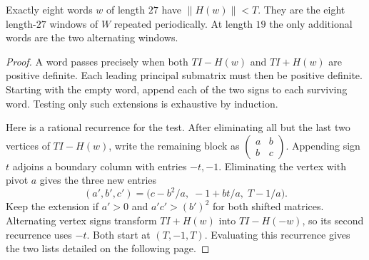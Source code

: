 \documentclass[11pt,letterpaper]{article}
\begin{document}
\begin{lemma}\label{lem:windows}
Exactly eight words $w$ of length $27$ have $\|H(w)\|<T$. They are the eight length-$27$ windows of $W$ repeated periodically. At length $19$ the only additional words are the two alternating windows.
\end{lemma}
\begin{proof}
A word passes precisely when both $TI-H(w)$ and $TI+H(w)$ are positive definite. Each leading principal submatrix must then be positive definite. Starting with the empty word, append each of the two signs to each surviving word. Testing only such extensions is exhaustive by induction.

Here is a rational recurrence for the test. After eliminating all but the last two vertices of $TI-H(w)$, write the remaining block as
$\left(\begin{smallmatrix}a&b\\b&c\end{smallmatrix}\right)$.
Appending sign $t$ adjoins a boundary column with entries $-t,-1$. Eliminating the vertex with pivot $a$ gives the three new entries
\[
     (a',b',c')=\bigl(c-b^2/a,\; -1+bt/a,\; T-1/a\bigr).
\]
Keep the extension if $a'>0$ and $a'c'>(b')^2$ for both shifted matrices. Alternating vertex signs transform $TI+H(w)$ into $TI-H(-w)$, so its second recurrence uses $-t$. Both start at $(T,-1,T)$. Evaluating this recurrence gives the two lists detailed on the following page.
\end{proof}


\newpage
\end{document}
